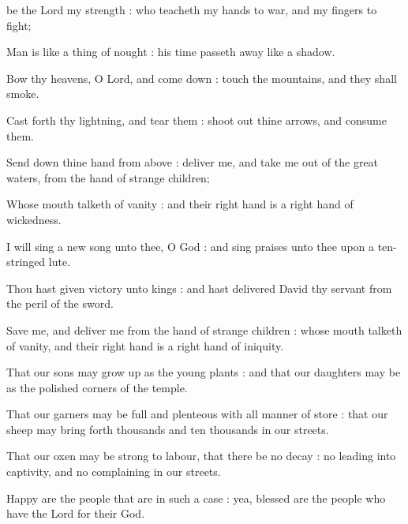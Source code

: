  be the Lord my strength : who teacheth my hands to war, and my fingers to fight;\par
{}
Man is like a thing of nought : his time passeth away like a shadow.\par
{}Bow thy heavens, O Lord, and come down : touch the mountains, and they shall smoke.\par
{}Cast forth thy lightning, and tear them : shoot out thine arrows, and consume them.\par
{}Send down thine hand from above : deliver me, and take me out of the great waters, from the hand of strange children;\par
{}Whose mouth talketh of vanity : and their right hand is a right hand of wickedness.\par
{}I will sing a new song unto thee, O God : and sing praises unto thee upon a ten-stringed lute.\par
{}Thou hast given victory unto kings : and hast delivered David thy servant from the peril of the sword.\par
{}Save me, and deliver me from the hand of strange children : whose mouth talketh of vanity, and their right hand is a right hand of iniquity.\par
{}That our sons may grow up as the young plants : and that our daughters may be as the polished corners of the temple.\par
{}That our garners may be full and plenteous with all manner of store : that our sheep may bring forth thousands and ten thousands in our streets.\par
{}That our oxen may be strong to labour, that there be no decay : no leading into captivity, and no complaining in our streets.\par
{}Happy are the people that are in such a case : yea, blessed are the people who have the Lord for their God.\par


